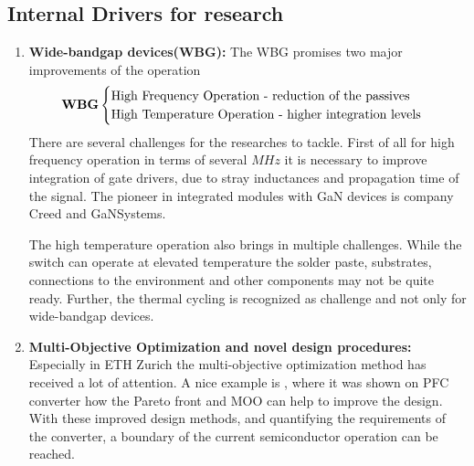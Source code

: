 \documentclass[]{scrartcl}
\begin{document}


\subsection{Internal Drivers for research}



\begin{enumerate}
	\item \textbf{Wide-bandgap devices(WBG):} The WBG promises two major improvements of the operation\cite{Kassakian2013}
	\begin{equation*}
	\text{\textbf{WBG}} \begin{cases}
	\text{High Frequency Operation - reduction of the passives } \\
	\text{High Temperature Operation - higher integration levels} 
	\end{cases}
	\end{equation*} 
	There are several challenges for the researches to tackle. First of all for high frequency operation in terms of several $MHz$ it is necessary to improve integration of gate drivers, due to stray inductances and propagation time of the signal. The pioneer in integrated modules with GaN devices is company Creed and GaNSystems. 
	
	The high temperature operation also brings in multiple challenges. While the switch can operate at elevated temperature the solder paste, substrates, connections to the environment and other components may not be quite ready.  Further,  the thermal cycling is recognized as challenge and not only for wide-bandgap devices\cite{Andresen2014a}.
	
	\item \textbf{Multi-Objective Optimization and novel design procedures:} Especially in ETH Zurich the multi-objective optimization method has received a lot of attention. A nice example is \cite{Kolar2009}, where it was shown on PFC converter how the Pareto front and MOO can help to improve the design. With these improved design methods, and quantifying the requirements of the converter, a boundary of the current semiconductor operation can be reached. 
	

\end{enumerate}
\end{document}
